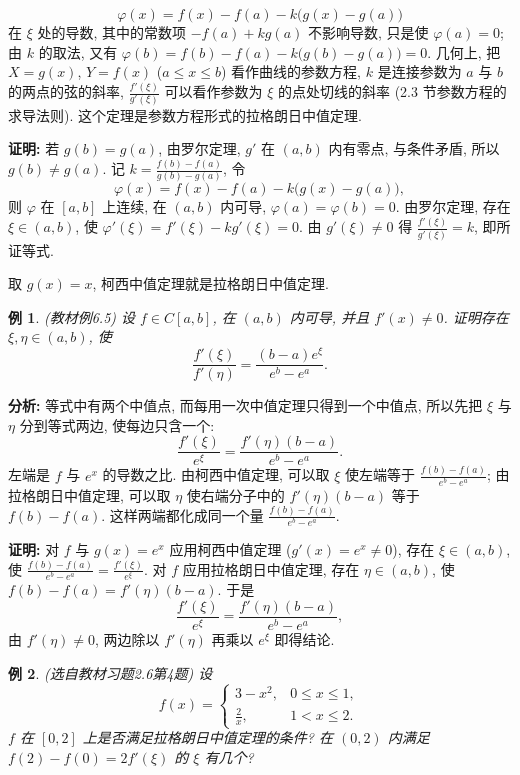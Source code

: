 \documentclass[UTF8,openany]{ctexbook}
\theoremstyle{chinesetextbook}
\newtheorem{example}{例}[section]
\newenvironment{cnproof}{\par\indent\textbf{证明:} \ignorespaces}{\par}
\begin{document}
\[
\varphi(x)=f(x)-f(a)-k\bigl(g(x)-g(a)\bigr)
\]
在 $\xi$ 处的导数, 其中的常数项 $-f(a)+kg(a)$ 不影响导数, 只是使 $\varphi(a)=0$; 由 $k$ 的取法, 又有 $\varphi(b)=f(b)-f(a)-k\bigl(g(b)-g(a)\bigr)=0$. 几何上, 把 $X=g(x)$, $Y=f(x)$ ($a\le x\le b$) 看作曲线的参数方程, $k$ 是连接参数为 $a$ 与 $b$ 的两点的弦的斜率, $\displaystyle\frac{f'(\xi)}{g'(\xi)}$ 可以看作参数为 $\xi$ 的点处切线的斜率 (2.3 节参数方程的求导法则). 这个定理是参数方程形式的拉格朗日中值定理.
\begin{cnproof}
若 $g(b)=g(a)$, 由罗尔定理, $g'$ 在 $(a,b)$ 内有零点, 与条件矛盾, 所以 $g(b)\ne g(a)$. 记 $\displaystyle k=\frac{f(b)-f(a)}{g(b)-g(a)}$, 令
\[
\varphi(x)=f(x)-f(a)-k\bigl(g(x)-g(a)\bigr),
\]
则 $\varphi$ 在 $[a,b]$ 上连续, 在 $(a,b)$ 内可导, $\varphi(a)=\varphi(b)=0$. 由罗尔定理, 存在 $\xi\in(a,b)$, 使 $\varphi'(\xi)=f'(\xi)-kg'(\xi)=0$. 由 $g'(\xi)\ne0$ 得 $\displaystyle\frac{f'(\xi)}{g'(\xi)}=k$, 即所证等式.
\end{cnproof}
取 $g(x)=x$, 柯西中值定理就是拉格朗日中值定理.
\begin{example}\label{ex:c2-6-5}
\textnormal{(教材例6.5)} 设 $f\in C[a,b]$, 在 $(a,b)$ 内可导, 并且 $f'(x)\ne0$. 证明存在 $\xi,\eta\in(a,b)$, 使
\[
\frac{f'(\xi)}{f'(\eta)}=\frac{(b-a)e^\xi}{e^b-e^a}.
\]
\end{example}
\par\indent\textbf{分析:} 等式中有两个中值点, 而每用一次中值定理只得到一个中值点, 所以先把 $\xi$ 与 $\eta$ 分到等式两边, 使每边只含一个:
\[
\frac{f'(\xi)}{e^\xi}=\frac{f'(\eta)(b-a)}{e^b-e^a}.
\]
左端是 $f$ 与 $e^x$ 的导数之比. 由柯西中值定理, 可以取 $\xi$ 使左端等于 $\displaystyle\frac{f(b)-f(a)}{e^b-e^a}$; 由拉格朗日中值定理, 可以取 $\eta$ 使右端分子中的 $f'(\eta)(b-a)$ 等于 $f(b)-f(a)$. 这样两端都化成同一个量 $\displaystyle\frac{f(b)-f(a)}{e^b-e^a}$.
\begin{cnproof}
对 $f$ 与 $g(x)=e^x$ 应用柯西中值定理 ($g'(x)=e^x\ne0$), 存在 $\xi\in(a,b)$, 使 $\displaystyle\frac{f(b)-f(a)}{e^b-e^a}=\frac{f'(\xi)}{e^\xi}$. 对 $f$ 应用拉格朗日中值定理, 存在 $\eta\in(a,b)$, 使 $f(b)-f(a)=f'(\eta)(b-a)$. 于是
\[
\frac{f'(\xi)}{e^\xi}=\frac{f'(\eta)(b-a)}{e^b-e^a},
\]
由 $f'(\eta)\ne0$, 两边除以 $f'(\eta)$ 再乘以 $e^\xi$ 即得结论.
\end{cnproof}
\begin{example}\label{ex:c2-h6-4}
\textnormal{(选自教材习题2.6第4题)} 设
\[
f(x)=\begin{cases}3-x^2,&0\le x\le1,\\\frac2x,&1<x\le2.\end{cases}
\]
$f$ 在 $[0,2]$ 上是否满足拉格朗日中值定理的条件? 在 $(0,2)$ 内满足 $f(2)-f(0)=2f'(\xi)$ 的 $\xi$ 有几个?
\end{example}
\end{document}
